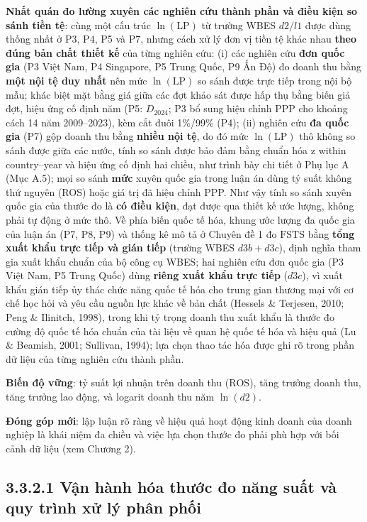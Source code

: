 \documentclass[
  a4paper,
  13pt]{extreport}
\begin{document}
\textbf{Nhất quán đo lường xuyên các nghiên cứu thành phần và điều kiện
so sánh tiền tệ}: cùng một cấu trúc \(\ln(\mathrm{LP})\) từ trường WBES
\(d2/l1\) được dùng thống nhất ở P3, P4, P5 và P7, nhưng cách xử lý đơn
vị tiền tệ khác nhau \textbf{theo đúng bản chất thiết kế} của từng
nghiên cứu: (i) các nghiên cứu \textbf{đơn quốc gia} (P3 Việt Nam, P4
Singapore, P5 Trung Quốc, P9 Ấn Độ) đo doanh thu bằng \textbf{một nội tệ
duy nhất} nên mức \(\ln(\mathrm{LP})\) so sánh được trực tiếp trong nội
bộ mẫu; khác biệt mặt bằng giá giữa các đợt khảo sát được hấp thụ bằng
biến giả đợt, hiệu ứng cố định năm (P5: \(D_{2024}\); P3 bổ sung hiệu
chỉnh PPP cho khoảng cách 14 năm 2009--2023), kèm cắt đuôi 1\%/99\%
(P4); (ii) nghiên cứu \textbf{đa quốc gia} (P7) gộp doanh thu bằng
\textbf{nhiều nội tệ}, do đó mức \(\ln(\mathrm{LP})\) thô không so sánh
được giữa các nước, tính so sánh được bảo đảm bằng chuẩn hóa z within
country--year và hiệu ứng cố định hai chiều, như trình bày chi tiết ở
Phụ lục A (Mục A.5); mọi so sánh \textbf{mức} xuyên quốc gia trong luận
án dùng tỷ suất không thứ nguyên (ROS) hoặc giá trị đã hiệu chỉnh PPP.
Như vậy tính so sánh xuyên quốc gia của thước đo là \textbf{có điều
kiện}, đạt được qua thiết kế ước lượng, không phải tự động ở mức thô. Về
phía biến quốc tế hóa, khung ước lượng đa quốc gia của luận án (P7, P8,
P9) và thống kê mô tả ở Chuyên đề 1 đo \(\mathrm{FSTS}\) bằng
\textbf{tổng xuất khẩu trực tiếp và gián tiếp} (trường WBES
\(d3b + d3c\)), định nghĩa tham gia xuất khẩu chuẩn của bộ công cụ WBES;
hai nghiên cứu đơn quốc gia (P3 Việt Nam, P5 Trung Quốc) dùng
\textbf{riêng xuất khẩu trực tiếp} (\(d3c\)), vì xuất khẩu gián tiếp ủy
thác chức năng quốc tế hóa cho trung gian thương mại với cơ chế học hỏi
và yêu cầu nguồn lực khác về bản chất (Hessels \& Terjesen, 2010; Peng
\& Ilinitch, 1998), trong khi tỷ trọng doanh thu xuất khẩu là thước đo
cường độ quốc tế hóa chuẩn của tài liệu về quan hệ quốc tế hóa và hiệu
quả (Lu \& Beamish, 2001; Sullivan, 1994); lựa chọn thao tác hóa được
ghi rõ trong phần dữ liệu của từng nghiên cứu thành phần.

\textbf{Biến độ vững}: tỷ suất lợi nhuận trên doanh thu
(\(\mathrm{ROS}\)), tăng trưởng doanh thu, tăng trưởng lao động, và
logarit doanh thu năm \(\ln(d2)\).

\textbf{Đóng góp mới}: lập luận rõ ràng về hiệu quả hoạt động kinh doanh
của doanh nghiệp là khái niệm đa chiều và việc lựa chọn thước đo phải
phù hợp với bối cảnh dữ liệu (xem Chương 2).

\hypertarget{vux1eadn-huxe0nh-huxf3a-thux1b0ux1edbc-ux111o-nux103ng-suux1ea5t-vuxe0-quy-truxecnh-xux1eed-luxfd-phuxe2n-phux1ed1i}{%
\subsection{3.3.2.1 Vận hành hóa thước đo năng suất và quy trình xử lý
phân
phối}\label{vux1eadn-huxe0nh-huxf3a-thux1b0ux1edbc-ux111o-nux103ng-suux1ea5t-vuxe0-quy-truxecnh-xux1eed-luxfd-phuxe2n-phux1ed1i}}
\end{document}
